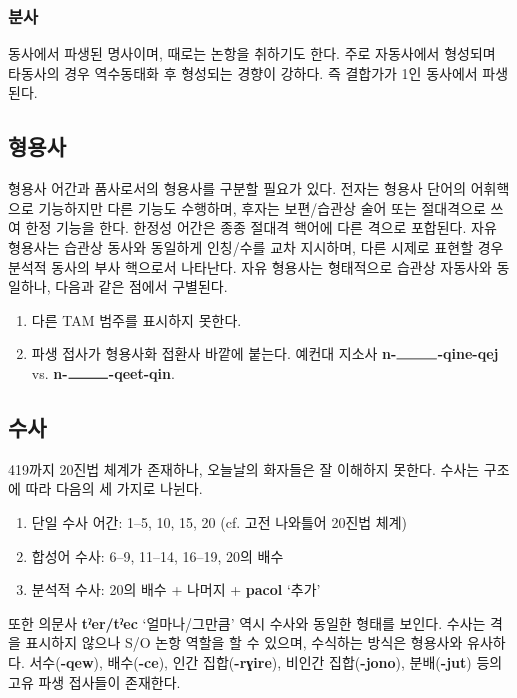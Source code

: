 \subsubsection{분사}
동사에서 파생된 명사이며, 때로는 논항을 취하기도 한다. 주로 자동사에서 형성되며 타동사의 경우 역수동태화 후 형성되는 경향이 강하다. 즉 결합가가 1인 동사에서 파생된다.
\subsection{형용사}
형용사 어간과 품사로서의 형용사를 구분할 필요가 있다. 전자는 형용사 단어의 어휘핵으로 기능하지만 다른 기능도 수행하며, 후자는 보편/습관상 술어 또는 절대격으로 쓰여 한정 기능을 한다. 한정성 어간은 종종 절대격 핵어에 다른 격으로 포합된다. 자유 형용사는 습관상 동사와 동일하게 인칭/수를 교차 지시하며, 다른 시제로 표현할 경우 분석적 동사의 부사 핵으로서 나타난다. 자유 형용사는 형태적으로 습관상 자동사와 동일하나, 다음과 같은 점에서 구별된다.
\begin{enumerate}
	\item 다른 TAM 범주를 표시하지 못한다.
	\item 파생 접사가 형용사화 접환사 바깥에 붙는다. 예컨대 지소사 \textbf{n-$\rule{1cm}{0.2mm}$-qine-qej} vs. \textbf{n-$\rule{1cm}{0.2mm}$-qeet-qin}.
	\end{enumerate}
\subsection{수사}
419까지 20진법 체계가 존재하나, 오늘날의 화자들은 잘 이해하지 못한다. 수사는 구조에 따라 다음의 세 가지로 나뉜다.
\begin{enumerate}
	\item 단일 수사 어간: 1--5, 10, 15, 20 (cf. 고전 나와틀어 20진법 체계)
	\item 합성어 수사: 6--9, 11--14, 16--19, 20의 배수
	\item 분석적 수사: 20의 배수 + 나머지 + \textbf{pacol} `추가'
\end{enumerate}
또한 의문사 \textbf{tˀer/tˀec} `얼마나/그만큼' 역시 수사와 동일한 형태를 보인다. 수사는 격을 표시하지 않으나 S/O 논항 역할을 할 수 있으며, 수식하는 방식은 형용사와 유사하다. 서수(\textbf{-qew}), 배수(\textbf{-ce}), 인간 집합(\textbf{-rɣire}), 비인간 집합(\textbf{-jono}), 분배(\textbf{-jut}) 등의 고유 파생 접사들이 존재한다. 
